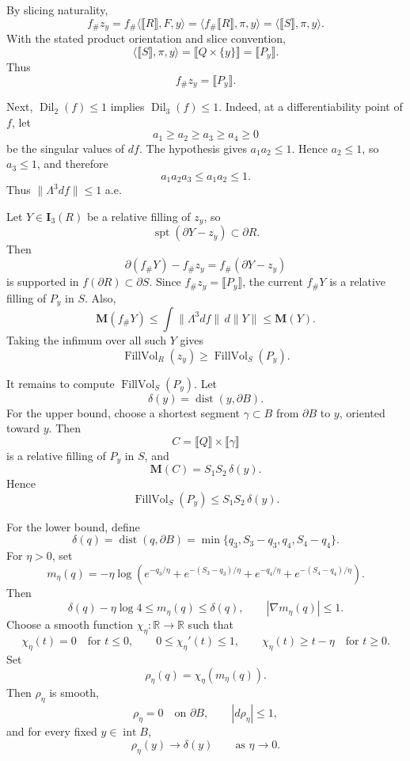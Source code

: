 \documentclass[12pt]{article}
\begin{document}
By slicing naturality,
\[
f_\# z_y
=
f_\#\langle \llbracket R\rrbracket,F,y\rangle
=
\langle f_\#\llbracket R\rrbracket,\pi,y\rangle
=
\langle \llbracket S\rrbracket,\pi,y\rangle .
\]
With the stated product orientation and slice convention,
\[
\langle \llbracket S\rrbracket,\pi,y\rangle
=
\llbracket Q\times\{y\}\rrbracket
=
\llbracket P_y\rrbracket.
\]
Thus
\[
f_\#z_y=\llbracket P_y\rrbracket.
\]

Next, \(\operatorname{Dil}_2(f)\le 1\) implies \(\operatorname{Dil}_3(f)\le 1\). Indeed, at a differentiability point of \(f\), let
\[
a_1\ge a_2\ge a_3\ge a_4\ge 0
\]
be the singular values of \(df\). The hypothesis gives \(a_1a_2\le 1\). Hence \(a_2\le 1\), so \(a_3\le 1\), and therefore
\[
a_1a_2a_3\le a_1a_2\le 1.
\]
Thus \(\|\Lambda^3df\|\le 1\) a.e.

Let \(Y\in \mathbf I_3(R)\) be a relative filling of \(z_y\), so
\[
\operatorname{spt}(\partial Y-z_y)\subset \partial R.
\]
Then
\[
\partial(f_\#Y)-f_\#z_y
=
f_\#(\partial Y-z_y)
\]
is supported in \(f(\partial R)\subset \partial S\). Since \(f_\#z_y=\llbracket P_y\rrbracket\), the current \(f_\#Y\) is a relative filling of \(P_y\) in \(S\). Also,
\[
\mathbf M(f_\#Y)\le \int \|\Lambda^3df\|\,d\|Y\|\le \mathbf M(Y).
\]
Taking the infimum over all such \(Y\) gives
\[
\operatorname{FillVol}_R(z_y)\ge \operatorname{FillVol}_S(P_y).
\]

It remains to compute \(\operatorname{FillVol}_S(P_y)\). Let
\[
\delta(y)=\operatorname{dist}(y,\partial B).
\]
For the upper bound, choose a shortest segment \(\gamma\subset B\) from \(\partial B\) to \(y\), oriented toward \(y\). Then
\[
C=\llbracket Q\rrbracket\times \llbracket \gamma\rrbracket
\]
is a relative filling of \(P_y\) in \(S\), and
\[
\mathbf M(C)=S_1S_2\,\delta(y).
\]
Hence
\[
\operatorname{FillVol}_S(P_y)\le S_1S_2\,\delta(y).
\]

For the lower bound, define
\[
\delta(q)=\operatorname{dist}(q,\partial B)
=
\min\{q_3,S_3-q_3,q_4,S_4-q_4\}.
\]
For \(\eta>0\), set
\[
m_\eta(q)
=
-\eta\log\left(
e^{-q_3/\eta}
+
e^{-(S_3-q_3)/\eta}
+
e^{-q_4/\eta}
+
e^{-(S_4-q_4)/\eta}
\right).
\]
Then
\[
\delta(q)-\eta\log 4\le m_\eta(q)\le \delta(q),
\qquad
|\nabla m_\eta(q)|\le 1.
\]
Choose a smooth function \(\chi_\eta:\mathbb R\to\mathbb R\) such that
\[
\chi_\eta(t)=0\quad\text{for }t\le 0,\qquad
0\le \chi_\eta'(t)\le 1,\qquad
\chi_\eta(t)\ge t-\eta\quad\text{for }t\ge 0.
\]
Set
\[
\rho_\eta(q)=\chi_\eta(m_\eta(q)).
\]
Then \(\rho_\eta\) is smooth,
\[
\rho_\eta=0\quad\text{on }\partial B,\qquad |d\rho_\eta|\le 1,
\]
and for every fixed \(y\in\operatorname{int}B\),
\[
\rho_\eta(y)\to \delta(y)
\qquad\text{as }\eta\to 0.
\]
\end{document}
